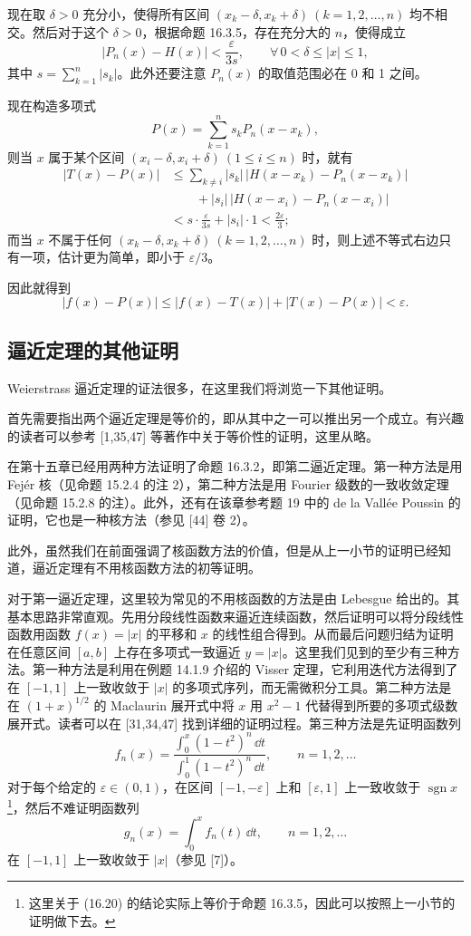 现在取 $\delta>0$ 充分小，使得所有区间 $(x_k-\delta,x_k+\delta)\ (k=1,2,\ldots,n)$ 均不相交。然后对于这个 $\delta>0$，根据命题 16.3.5，存在充分大的 $n$，使得成立
\[
  |P_n(x)-H(x)|<\frac{\varepsilon}{3s},\qquad
  \forall\,0<\delta\leqslant|x|\leqslant1,
\]
其中 $s=\sum_{k=1}^n|s_k|$。此外还要注意 $P_n(x)$ 的取值范围必在 0 和 1 之间。

现在构造多项式
\[
  P(x)=\sum_{k=1}^n s_kP_n(x-x_k),
\]
则当 $x$ 属于某个区间 $(x_i-\delta,x_i+\delta)\ (1\leqslant i\leqslant n)$ 时，就有
\[
\begin{aligned}
  |T(x)-P(x)|
  &\leqslant\sum_{k\ne i}|s_k|\,|H(x-x_k)-P_n(x-x_k)|\\
  &\qquad+|s_i|\,|H(x-x_i)-P_n(x-x_i)|\\
  &<s\cdot\frac{\varepsilon}{3s}+|s_i|\cdot1<\frac{2\varepsilon}{3};
\end{aligned}
\]
而当 $x$ 不属于任何 $(x_k-\delta,x_k+\delta)\ (k=1,2,\ldots,n)$ 时，则上述不等式右边只有一项，估计更为简单，即小于 $\varepsilon/3$。

因此就得到
\[
  |f(x)-P(x)|\leqslant|f(x)-T(x)|+|T(x)-P(x)|<\varepsilon.
\]

\subsection{逼近定理的其他证明}

Weierstrass 逼近定理的证法很多，在这里我们将浏览一下其他证明。

首先需要指出两个逼近定理是等价的，即从其中之一可以推出另一个成立。有兴趣的读者可以参考 [1,35,47] 等著作中关于等价性的证明，这里从略。

在第十五章已经用两种方法证明了命题 16.3.2，即第二逼近定理。第一种方法是用 Fejér 核（见命题 15.2.4 的注 2），第二种方法是用 Fourier 级数的一致收敛定理（见命题 15.2.8 的注）。此外，还有在该章参考题 19 中的 de la Vallée Poussin 的证明，它也是一种核方法（参见 [44] 卷 2）。

此外，虽然我们在前面强调了核函数方法的价值，但是从上一小节的证明已经知道，逼近定理有不用核函数方法的初等证明。

对于第一逼近定理，这里较为常见的不用核函数的方法是由 Lebesgue 给出的。其基本思路非常直观。先用分段线性函数来逼近连续函数，然后证明可以将分段线性函数用函数 $f(x)=|x|$ 的平移和 $x$ 的线性组合得到。从而最后问题归结为证明在任意区间 $[a,b]$ 上存在多项式一致逼近 $y=|x|$。这里我们见到的至少有三种方法。第一种方法是利用在例题 14.1.9 介绍的 Visser 定理，它利用迭代方法得到了在 $[-1,1]$ 上一致收敛于 $|x|$ 的多项式序列，而无需微积分工具。第二种方法是在 $(1+x)^{1/2}$ 的 Maclaurin 展开式中将 $x$ 用 $x^2-1$ 代替得到所要的多项式级数展开式。读者可以在 [31,34,47] 找到详细的证明过程。第三种方法是先证明函数列
\begin{equation}
  f_n(x)=\frac{\displaystyle\int_0^x(1-t^2)^n\,\dd t}
  {\displaystyle\int_0^1(1-t^2)^n\,\dd t},\qquad n=1,2,\ldots
\tag{16.20}
\label{eq:16.20}
\end{equation}
对于每个给定的 $\varepsilon\in(0,1)$，在区间 $[-1,-\varepsilon]$ 上和 $[\varepsilon,1]$ 上一致收敛于 $\operatorname{sgn}x$\footnote{这里关于 (16.20) 的结论实际上等价于命题 16.3.5，因此可以按照上一小节的证明做下去。}，然后不难证明函数列
\[
  g_n(x)=\int_0^x f_n(t)\,\dd t,\qquad n=1,2,\ldots
\]
在 $[-1,1]$ 上一致收敛于 $|x|$（参见 [7]）。

